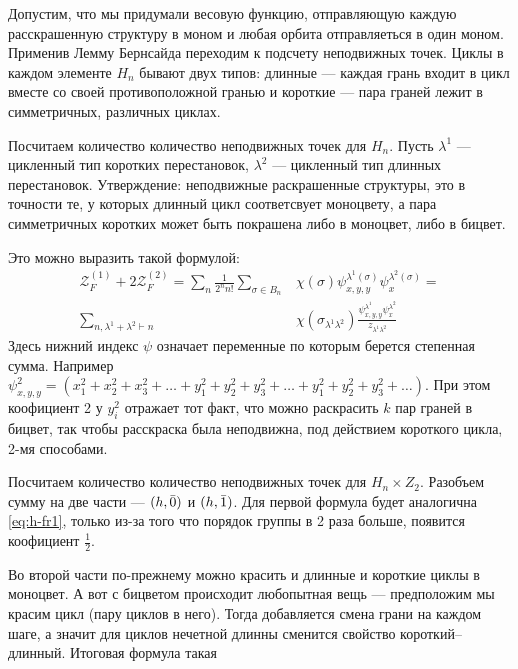 Допустим, что мы придумали весовую функцию, отправляющую каждую расскрашенную
структуру в моном и любая орбита отправляеться в один моном. Применив Лемму
Бернсайда переходим к подсчету неподвижных точек. Циклы в каждом элементе $H_n$
бывают двух типов:
длинные --- каждая грань входит в цикл вместе со своей противоположной гранью и
короткие --- пара граней лежит в симметричных, различных циклах. 

Посчитаем количество количество неподвижных точек для $H_n$. Пусть $\lambda^1$
--- цикленный тип коротких перестановок, $\lambda^2$ --- цикленный тип длинных
перестановок. Утверждение: неподвижные раскрашенные структуры, это в точности
те, у которых длинный цикл соответсвует моноцвету, а пара симметричных коротких 
может быть покрашена либо в моноцвет, либо в бицвет.

Это можно выразить такой формулой:
\begin{equation}
\label{eq:h-fr1}
\begin{split}
\mathcal Z_F^{(1)} + 2\mathcal Z_F^{(2)} = 
\sum_{n}\frac{1}{2^{n}n!}\sum_{\sigma \in B_n}&\chi(\sigma)
\psi_{x, y, y}^{\lambda^1(\sigma)} \psi_{x}^{\lambda^2(\sigma)} = \\
\sum_{n, \lambda^1 + \lambda^2 \vdash n}&\chi(\sigma_{\lambda^1 \lambda^2})
\frac{\psi_{x, y, y}^{\lambda^1} \psi_{x}^{\lambda^2}}{z_{\lambda^1 \lambda^2}}
\end{split}
\end{equation}
Здесь нижний индекс $\psi$ означает переменные по которым берется степенная
сумма. Например $\psi_{x, y, y}^2 =  (x_1^2 + x_2^2 + x_3^2 + \dots + y_1^2 +
y_2^2 + y_3^2 + \dots + y_1^2 + y_2^2 + y_3^2 + \dots)$. При этом коофициент
2 у $y_i^2$ отражает тот факт, что можно раскрасить $k$ пар граней в бицвет,
так чтобы расскраска была неподвижна, под действием короткого цикла, 2-мя способами.

Посчитаем количество количество неподвижных точек для $H_n \times Z_2$. Разобъем
сумму на две части --- $(h, \Bar 0)$ и $(h, \Bar 1)$. Для первой формула будет
аналогична \ref{eq:h-fr1}, только из-за того что порядок группы в 2 раза больше,
появится коофициент $\frac{1}{2}$.

Во второй части по-прежнему можно красить и длинные и короткие циклы в моноцвет.
А вот с бицветом происходит любопытная вещь --- предположим мы красим цикл (пару
циклов в него). Тогда добавляется смена грани на каждом шаге, а значит для
циклов нечетной длинны сменится свойство короткий--длинный. Итоговая формула
такая 

